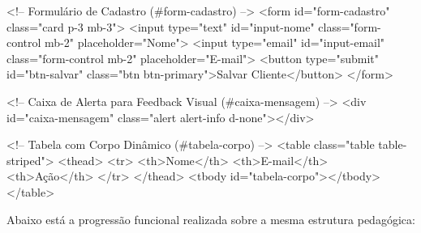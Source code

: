 \begin{boxCodigoHTML}
<!-- Formulário de Cadastro (#form-cadastro) -->
<form id="form-cadastro" class="card p-3 mb-3">
  <input type="text" id="input-nome" 
         class="form-control mb-2" placeholder="Nome">
  <input type="email" id="input-email" 
         class="form-control mb-2" placeholder="E-mail">
  <button type="submit" id="btn-salvar" 
          class="btn btn-primary">Salvar Cliente</button>
</form>

<!-- Caixa de Alerta para Feedback Visual (#caixa-mensagem) -->
<div id="caixa-mensagem" 
     class="alert alert-info d-none"></div>

<!-- Tabela com Corpo Dinâmico (#tabela-corpo) -->
<table class="table table-striped">
  <thead>
    <tr>
      <th>Nome</th>
      <th>E-mail</th>
      <th>Ação</th>
    </tr>
  </thead>
  <tbody id="tabela-corpo"></tbody>
</table>
\end{boxCodigoHTML}

Abaixo está a progressão funcional realizada sobre a mesma estrutura pedagógica:

